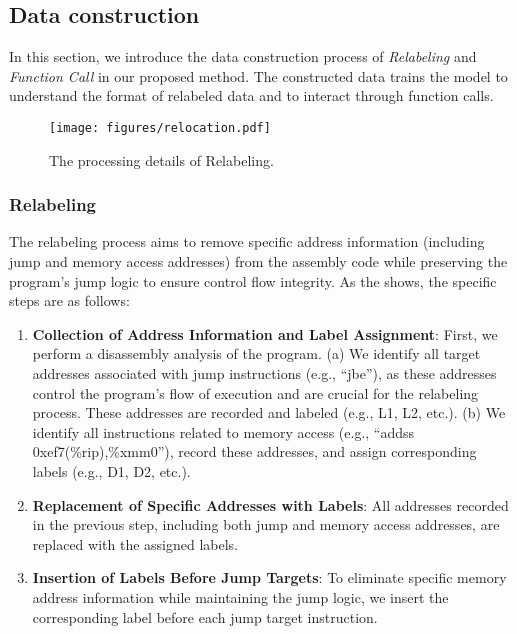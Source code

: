 \subsection{Data construction}

In this section, we introduce the data construction process of \textit{Relabeling} and \textit{Function Call} in our proposed method.
The constructed data trains the model to understand the format of relabeled data and to interact through function calls.

\begin{figure}[t]
    \centering
    \texttt{[image: figures/relocation.pdf]}
    \caption{The processing details of Relabeling.}
    \label{fig:relabeling}
\end{figure}

\subsubsection{Relabeling}

The relabeling process aims to remove specific address information (including jump and memory access addresses) from the assembly code while preserving the program's jump logic to ensure control flow integrity. 
As the  shows, the specific steps are as follows:

\begin{enumerate}
    \item \textbf{Collection of Address Information and Label Assignment}: First, we perform a disassembly analysis of the program. (a) We identify all target addresses associated with jump instructions (e.g., ``jbe''), as these addresses control the program's flow of execution and are crucial for the relabeling process. These addresses are recorded and labeled (e.g., L1, L2, etc.). (b) We identify all instructions related to memory access (e.g., ``addss 0xef7(\%rip),\%xmm0''), record these addresses, and assign corresponding labels (e.g., D1, D2, etc.).
    \item \textbf{Replacement of Specific Addresses with Labels}: All addresses recorded in the previous step, including both jump and memory access addresses, are replaced with the assigned labels.
    \item \textbf{Insertion of Labels Before Jump Targets}: To eliminate specific memory address information while maintaining the jump logic, we insert the corresponding label before each jump target instruction.
\end{enumerate}

